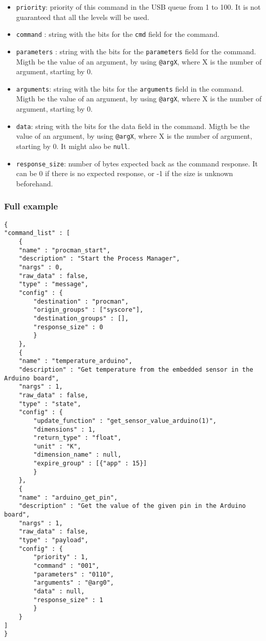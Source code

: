\documentclass[12pt,a4paper]{report}
\begin{document}
\begin{itemize}
\item \texttt{priority}: priority of this command in the USB queue from 1 to 100. It is not guaranteed that all the levels will be used.
\item \texttt{command} : string with the bits for the \texttt{cmd} field for the command.
\item \texttt{parameters} : string with the bits for the \texttt{parameters} field for the command. Migth be the value of an argument, by using \texttt{@argX}, where X is the number of argument, starting by 0.
\item \texttt{arguments}: string with the bits for the \texttt{arguments} field in the command. Migth be the value of an argument, by using \texttt{@argX}, where X is the number of argument, starting by 0.
\item \texttt{data}: string with the bits for the data field in the command. Migth be the value of an argument, by using \texttt{@argX}, where X is the number of argument, starting by 0. It might also be \texttt{null}.
\item \texttt{response\_size}: number of bytes expected back as the command response. It can be 0 if there is no expected response, or -1 if the size is unknown beforehand.
\end{itemize}

\subsubsection*{Full example}
\begin{lstlisting}
{
"command_list" : [
	{
	"name" : "procman_start",
	"description" : "Start the Process Manager",
	"nargs" : 0,
	"raw_data" : false,
	"type" : "message",
	"config" : {
		"destination" : "procman",
		"origin_groups" : ["syscore"],
		"destination_groups" : [],
		"response_size" : 0
		}
	},
	{
	"name" : "temperature_arduino",
	"description" : "Get temperature from the embedded sensor in the Arduino board",
	"nargs" : 1,
	"raw_data" : false,
	"type" : "state",
	"config" : {
		"update_function" : "get_sensor_value_arduino(1)",
		"dimensions" : 1,
		"return_type" : "float",
		"unit" : "K",
		"dimension_name" : null,
		"expire_group" : [{"app" : 15}]
		}
	},
	{
	"name" : "arduino_get_pin",
	"description" : "Get the value of the given pin in the Arduino board",
	"nargs" : 1,
	"raw_data" : false,
	"type" : "payload",
	"config" : {
		"priority" : 1,
		"command" : "001",
		"parameters" : "0110",
		"arguments" : "@arg0",
		"data" : null,
		"response_size" : 1
		}
	}
]
}			
\end{lstlisting}
\end{document}
